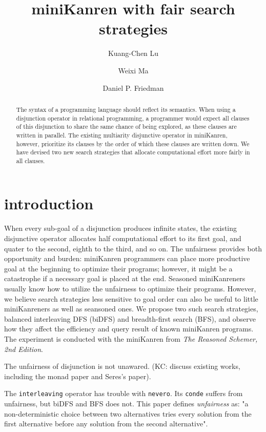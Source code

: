 \documentclass[format=acmlarge, review=true, authordraft=true]{acmart}
\title{miniKanren with fair search strategies}
\author{Kuang-Chen Lu}
\affiliation{Indiana University}
\author{Weixi Ma}
\affiliation{Indiana University}
\author{Daniel P. Friedman}
\affiliation{Indiana University}
\begin{document}
\begin{abstract}

The syntax of a programming language should reflect its semantics. When using a
disjunction operator in relational programming, a programmer would expect all
clauses of this disjunction to share the same chance of being explored, as
these clauses are written in parallel. The existing multiarity disjunctive
operator in miniKanren, however, prioritize its clauses by the order of which
these clauses are written down. We have devised two new search strategies that
allocate computational effort more fairly in all clauses.

\end{abstract}

\maketitle

\section{introduction}

When every sub-goal of a disjunction produces infinite states, the existing 
disjunctive operator allocates half computational effort to its first goal, and 
quater to the second, eighth to the third, and so on. The unfairness provides 
both opportunity and burden: miniKanren programmers can place more productive 
goal at the beginning to optimize their programs; however, it might be a 
catastrophe if a necessary goal is placed at the end. Seasoned miniKanreners 
usually know how to utilize the unfairness to optimize their programs. However, 
we believe search strategies less sensitive to goal order can also be useful to 
little miniKanreners as well as seansoned ones. We propose two such search 
strategies, balanced interleaving DFS (biDFS) and breadth-first search (BFS), 
and observe how they affect the efficiency and query result of known miniKanren 
programs. The experiment is conducted with the miniKanren from \textit{The 
Reasoned Schemer, 2nd Edition}.

The unfairness of disjunction is not unawared. (KC: discuss existing works, 
including the monad paper and Seres's paper).




The \texttt{interleaving} operator has trouble with \texttt{nevero}. Its 
\texttt{conde} suffers from unfairness, but biDFS and BFS does not. This paper 
defines \textit{unfairness} as: "a non-deterministic choice between two 
alternatives tries every solution from the first alternative before any 
solution from the second alternative".
\end{document}
